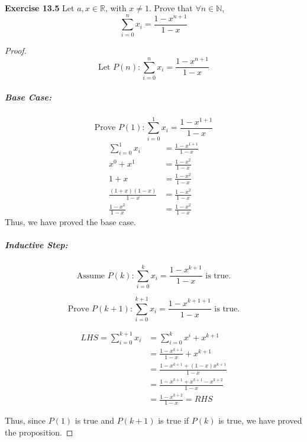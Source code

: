 \documentclass[12pt,oneside]{article}
\newenvironment{exercise}[1]{\vspace{.1in}\noindent\textbf{Exercise #1 \hspace{.05em}}}{}
\newcommand{\R}{\mathbb{R}}
\newcommand{\N}{\mathbb{N}}
\begin{document}
\begin{exercise}{13.5}
Let $a,x \in \R$, with $x \not=1$. Prove that $\forall n \in \N$,
\begin{equation*}
\sum_{i=0}^n x_i = \frac{1-x^{n+1}}{1-x}
\end{equation*}
\end{exercise}

\begin{proof}
\begin{equation*}
\text{Let~} P(n): \sum_{i=0}^n x_i = \frac{1-x^{n+1}}{1-x}
\end{equation*}

\subparagraph*{Base Case:}
\begin{equation*}
\text{Prove~} P(1): \sum_{i=0}^1 x_i = \frac{1-x^{1+1}}{1-x}
\end{equation*}
\begin{align*}
\sum_{i=0}^1 x_i &= \frac{1-x^{1+1}}{1-x}\\
x^0+x^1 &= \frac{1-x^2}{1-x}\\
1+x &= \frac{1-x^2}{1-x}\\
\frac{(1+x)(1-x)}{1-x} &= \frac{1-x^2}{1-x}\\
\frac{1-x^2}{1-x} &= \frac{1-x^2}{1-x}
\end{align*}
Thus, we have proved the base case.

\subparagraph*{Inductive Step:} 
\begin{equation*}
\text{Assume~} P(k): \sum_{i=0}^k x_i = \frac{1-x^{k+1}}{1-x} \text{~is true.}
\end{equation*}

\begin{equation*}
\text{Prove~} P(k+1): \sum_{i=0}^{k+1} x_i = \frac{1-x^{k+1+1}}{1-x} \text{~is true.}
\end{equation*}

\begin{align*}
\textit{LHS} = \sum_{i=0}^{k+1} x_i &= \sum_{i=0}^k x^i + x^{k+1}\\
&= \frac{1-x^{k+1}}{1-x} + x^{k+1} \\
&= \frac{1-x^{k+1}+(1-x)x^{k+1}}{1-x} \\
&= \frac{1-x^{k+1}+x^{k+1}-x^{k+2}}{1-x} \\
&= \frac{1-x^{k+2}}{1-x} = \textit{RHS}
\end{align*}

Thus, since $P(1)$ is true and $P(k+1)$ is true if $P(k)$ is true, we have proved the proposition.
\end{proof}
\end{document}
